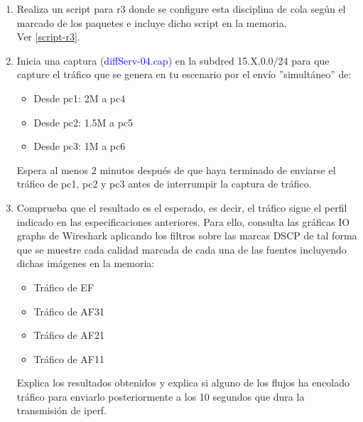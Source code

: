 \documentclass[12pt, a4paper]{report}
\begin{document}
\begin{enumerate}
	\item Realiza un script para r3 donde se configure esta disciplina de cola según el marcado de los
	paquetes e incluye dicho script en la memoria.\\
	
	Ver \ref{script-r3}.
	\item Inicia una captura (\textcolor{blue}{diffServ-04.cap}) en la subdred 15.X.0.0/24 para que capture el tráfico que
	se genera en tu escenario por el envío ”simultáneo” de:
	\begin{itemize}
		\item Desde pc1: 2M a pc4
		\item Desde pc2: 1.5M a pc5
		\item Desde pc3: 1M a pc6
	\end{itemize}
	Espera al menos 2 minutos después de que haya terminado de enviarse el tráfico de pc1, pc2 y
	pc3 antes de interrumpir la captura de tráfico.
	\item Comprueba que el resultado es el esperado, es decir, el tráfico sigue el perfil indicado en las
	especificaciones anteriores. Para ello, consulta las gráficas IO graphs de Wireshark aplicando
	los filtros sobre las marcas DSCP de tal forma que se muestre cada calidad marcada de cada
	una de las fuentes incluyendo dichas imágenes en la memoria:
	\begin{itemize}
		\item Tráfico de EF
		\item Tráfico de AF31
		\item Tráfico de AF21
		\item Tráfico de AF11
	\end{itemize}
	Explica los resultados obtenidos y explica si alguno de los flujos ha encolado tráfico para enviarlo
	posteriormente a los 10 segundos que dura la transmisión de iperf.\\
	

\end{enumerate}
\end{document}
